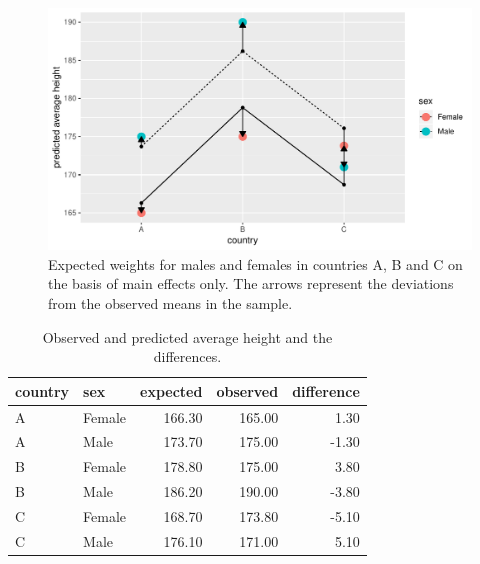 \documentclass[]{report}\usepackage[]{graphicx}\usepackage[]{color}
\makeatletter
\def\maxwidth{ %
  \ifdim\Gin@nat@width>\linewidth
    \linewidth
  \else
    \Gin@nat@width
  \fi
}
\newenvironment{knitrout}{}{} %
\makeatother
\begin{document}
\begin{knitrout}
\color{fgcolor}\begin{figure}

{\centering \includegraphics[width=\maxwidth]{figure/country_sex4-1} 

}

\caption[Expected weights for males and females in countries A, B and C on the basis of main effects only]{Expected weights for males and females in countries A, B and C on the basis of main effects only. The arrows represent the deviations from the observed means in the sample.}\label{fig:country_sex4}
\end{figure}


\end{knitrout}

\begin{table}[ht]
\centering
\caption{Observed and predicted average height and the differences.} 
\label{tab:country_sex5}
\begin{tabular}{llrrr}
  \hline
country & sex & expected & observed & difference \\ 
  \hline
A & Female & 166.30 & 165.00 & 1.30 \\ 
  A & Male & 173.70 & 175.00 & -1.30 \\ 
  B & Female & 178.80 & 175.00 & 3.80 \\ 
  B & Male & 186.20 & 190.00 & -3.80 \\ 
  C & Female & 168.70 & 173.80 & -5.10 \\ 
  C & Male & 176.10 & 171.00 & 5.10 \\ 
   \hline
\end{tabular}
\end{table}
\end{document}
